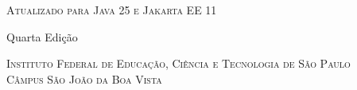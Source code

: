 {
    \thispagestyle{empty}
    
    \center
    
    \vspace*{4.5cm}
    \noindent
    \chaptitlefont\HUGE\textsc{\thetitle}
    
    {\chaptitlefont\large\textsc{Atualizado para Java 25 e Jakarta EE 11}}
    
    {\normalsize Quarta Edição}
    
    \vspace{4.5cm}
    \noindent
    \chaptitlefont\Large\textsc{\theauthor}
    
    \chaptitlefont\tiny\textsc{Instituto Federal de Educação, Ciência e Tecnologia de São Paulo}\\
    \chaptitlefont\tiny\textsc{Câmpus São João da Boa Vista}
        
    \vfill
    \restoregeometry
}